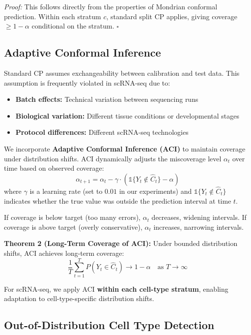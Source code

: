 \documentclass{article}
\begin{document}
\textit{Proof:} This follows directly from the properties of Mondrian conformal prediction. Within each stratum $c$, standard split CP applies, giving coverage $\geq 1-\alpha$ conditional on the stratum. $\square$

\subsection{Adaptive Conformal Inference}

Standard CP assumes exchangeability between calibration and test data. This assumption is frequently violated in scRNA-seq due to:
\begin{itemize}
    \item \textbf{Batch effects:} Technical variation between sequencing runs
    \item \textbf{Biological variation:} Different tissue conditions or developmental stages
    \item \textbf{Protocol differences:} Different scRNA-seq technologies
\end{itemize}

We incorporate \textbf{Adaptive Conformal Inference (ACI)} to maintain coverage under distribution shifts. ACI dynamically adjusts the miscoverage level $\alpha_t$ over time based on observed coverage:
\begin{equation}
    \alpha_{t+1} = \alpha_t - \gamma \cdot (\mathbb{1}\{Y_t \notin \hat{C}_t\} - \alpha)
\end{equation}
where $\gamma$ is a learning rate (set to $0.01$ in our experiments) and $\mathbb{1}\{Y_t \notin \hat{C}_t\}$ indicates whether the true value was outside the prediction interval at time $t$.

If coverage is below target (too many errors), $\alpha_t$ decreases, widening intervals. If coverage is above target (overly conservative), $\alpha_t$ increases, narrowing intervals.

\textbf{Theorem 2 (Long-Term Coverage of ACI):} Under bounded distribution shifts, ACI achieves long-term coverage:
\begin{equation}
    \frac{1}{T} \sum_{t=1}^T P(Y_t \in \hat{C}_t) \rightarrow 1 - \alpha \quad \text{as } T \rightarrow \infty
\end{equation}

For scRNA-seq, we apply ACI \textbf{within each cell-type stratum}, enabling adaptation to cell-type-specific distribution shifts.

\subsection{Out-of-Distribution Cell Type Detection}
\end{document}
